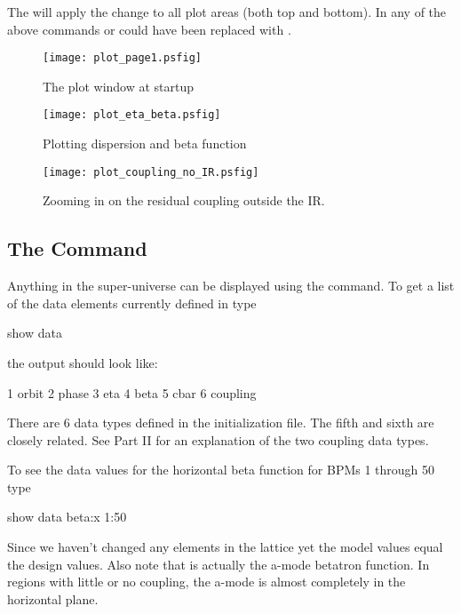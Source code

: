 The  will apply the change to all plot areas (both top and bottom). In
any of the above commands  or  could have been replaced
with .

\begin{figure}
  \centering
  \texttt{[image: plot\_page1.psfig]}
  \caption{The plot window at startup}
  \label{f:plot_begin}
\end{figure}

\begin{figure}
  \centering
  \texttt{[image: plot\_eta\_beta.psfig]}
  \caption{Plotting dispersion and beta function}
  \label{f:plot_eta_beta}
\end{figure}

\begin{figure}
  \centering
  \texttt{[image: plot\_coupling\_no\_IR.psfig]}
  \caption{Zooming in on the residual coupling outside the IR.}
  \label{f:plot_coupling_no_IR}
\end{figure}

\subsection{The  Command}

Anything in the super-universe can be displayed using the  command. To
get a list of the data elements currently defined in \tao type
\begin{example}
  show data
\end{example}
the output should look like:
\begin{example}
   1  orbit
   2  phase
   3  eta
   4  beta
   5  cbar
   6  coupling
\end{example}
There are 6 data types defined in the initialization file. The fifth and sixth are 
closely related. See Part II for an explanation of the two coupling data types.

To see the data values for the horizontal beta function for \cesr BPMs 1 through
50 type
\begin{example}
  show data beta:x 1:50
\end{example}
Since we haven't changed any elements in the lattice yet the model values equal
the design values. Also note that  is actually the a-mode betatron
function. In regions with little or no coupling, the a-mode is almost completely
in the horizontal plane.

